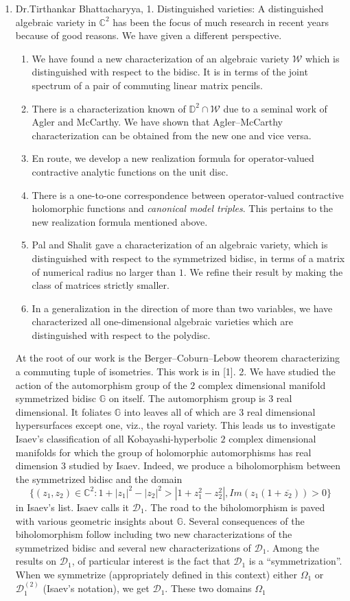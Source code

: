 \begin{enumerate}
\item Dr.Tirthankar Bhattacharyya, 1. Distinguished varieties:  A distinguished algebraic variety in $\mathbb{C}^2$ has been the focus of much research in recent years because of good reasons. We have given a different perspective.  \begin{enumerate}  \item We have found a new characterization of an algebraic variety $\mathcal W$ which is distinguished with respect to the bidisc. It is in terms of the joint spectrum of a pair of commuting linear matrix pencils.  \item There is a characterization known of $\mathbb{D}^2\cap\mathcal{W}$ due to a seminal work of Agler and McCarthy. We have shown that Agler--McCarthy characterization can be obtained from the new one and vice versa.  \item En route, we develop a new realization formula for operator-valued contractive analytic functions on the unit disc.  \item There is a one-to-one correspondence between operator-valued contractive holomorphic functions and {\em canonical model triples}. This pertains to the new realization formula mentioned above.  \item Pal and Shalit gave a characterization of an algebraic variety, which is distinguished with respect to the symmetrized bidisc, in terms of a matrix of numerical radius no larger than $1$. We refine their result by making the class of matrices strictly smaller.  \item In a generalization in the direction of more than two variables, we have characterized all one-dimensional algebraic  varieties which are distinguished  with respect to the polydisc. \end{enumerate} At the root of our work is the Berger--Coburn--Lebow theorem characterizing a commuting tuple of isometries. This work is in [1].  2. We have studied the action of the automorphism group of the $2$ complex dimensional manifold symmetrized bidisc $\mathbb G$ on itself. The automorphism group is $3$ real dimensional. It foliates $\mathbb G$ into leaves all of which are $3$ real dimensional hypersurfaces except one, viz., the royal variety. This leads us to investigate Isaev's classification of all Kobayashi-hyperbolic $2$ complex dimensional  manifolds for which the group of holomorphic automorphisms has real dimension $3$ studied by Isaev. Indeed, we produce a biholomorphism between the symmetrized bidisc and the domain  \[\{(z_1,z_2)\in \mathbb{C} ^2 : 1+|z_1|^2-|z_2|^2>|1+ z_1 ^2 -z_2 ^2|, Im(z_1 (1+\overline{z_2}))>0\}\]  in Isaev's list. Isaev calls it $\mathcal D_1$. The road to the biholomorphism is paved with various geometric insights about $\mathbb G$.    Several consequences of the biholomorphism follow including two new characterizations of the symmetrized bidisc and several new characterizations of $\mathcal D_1$. Among the results on $\mathcal D_1$, of particular interest is the fact that $\mathcal D_1$ is a ``symmetrization''. When we symmetrize (appropriately defined in this context) either $\Omega_1$ or $\mathcal{D}^{(2)} _1$ (Isaev's notation), we get $\mathcal D_1$.  These two domains $\Omega_1$ 
\end{enumerate}
